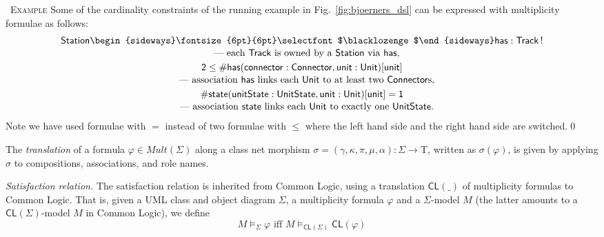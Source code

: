 \documentclass[10pt,fleqn,%
\ifpretendfinal
final%
\else
draft%
\fi,
]{scrreprt}
\newcommand*{\CL}{\ensuremath{\mathsf{CL}}\xspace}
\newenvironment{example}[0]{\ \newline \textsc{Example}\quad }{}
\newcommand{\uml}[1]{\textsf{#1}}
\newcommand{\composition}{\raisebox{0.2pt}{\begin{sideways}\fontsize{6pt}{6pt}\selectfont$\blacklozenge$\end{sideways}}}
\newcommand{\Tau}{\mathrm{T}}
\begin{document}
\begin{example}\label{ex:dsl-sen}
Some of the cardinality constraints of the running example in
Fig.~\ref{fig:bjoerners_dsl} can be expressed with multiplicity
formulae as follows:
%
\begin{gather*}
  \mathsf{Station\composition has : Track \,!}
\\[-.5ex]
\quad\text{--- each \uml{Track} is owned by a \uml{Station} via \uml{has}},
\\
  \mathsf{2 \leq \#has(connector : Connector, unit : Unit)[unit]}
\\[-.5ex]
  \quad\text{--- association \uml{has} links each \uml{Unit} to at least two \uml{Connector}s},
\\
  \mathsf{\#state(unitState : UnitState, unit : Unit)[unit] = 1}
\\[-.5ex]
  \quad\text{--- association \uml{state} links each \uml{Unit} to exactly one \uml{UnitState}}.
\end{gather*}
%
Note we have used formulae with $=$ instead of two formulae with
$\leq$ where the left hand side and the right hand side are
switched.\qed
\end{example}

The \emph{translation} of a formula $\varphi \in
\mathit{Mult}(\Sigma)$ along a class net morphism $\sigma =
(\gamma, \kappa, \pi, \mu, \alpha) : \Sigma \to \Tau$, written as
$\sigma(\varphi)$, is given by applying $\sigma$ to compositions,
associations, and role names.

\smallskip\noindent
\textit{Satisfaction relation.}
The satisfaction relation is inherited from Common Logic, using
a translation $\CL(\_)$ of multiplicity formulas to Common Logic.
That is, given a UML class and object diagram $\Sigma$, a
multiplicity formula $\varphi$ and a $\Sigma$-model $M$ (the
latter amounts to a $\CL(\Sigma)$-model $M$ in Common Logic), we define
$$M\models_\Sigma\varphi\text{ iff }M\models_{\CL(\Sigma)}\CL(\varphi)$$
\end{document}
